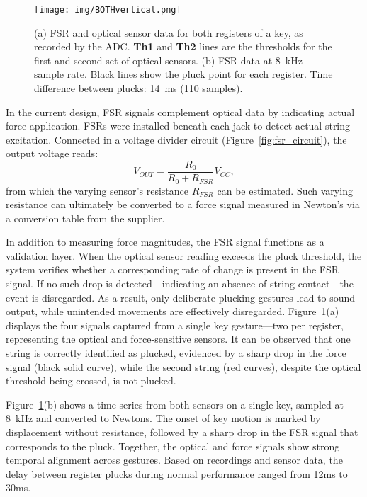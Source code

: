 \begin{figure}
    \centering
    \texttt{[image: img/BOTHvertical.png]}
    \caption{
    (a) FSR and optical sensor data for both registers of a key, as recorded by the ADC. 
    \textbf{Th1} and \textbf{Th2} lines are the thresholds for the first and second set of optical sensors.     
    (b) FSR data at 8~kHz sample rate. Black lines show the pluck point for each register. Time difference between plucks: 14~ms (110 samples).    }
    \label{fig:fsr-dif}
\end{figure}


In the current design, FSR signals complement optical data by indicating actual force application. FSRs were installed beneath each jack to detect actual string excitation. Connected in a voltage divider circuit (Figure~\ref{fig:fsr_circuit}), the output voltage reads:
\begin{equation}\label{eq:fsr_circuit}
V_{OUT} = \frac{R_0}{R_0 + R_{FSR}}V_{CC},
\end{equation}
from which the varying sensor's resistance $R_{FSR}$ can be estimated. Such varying resistance can ultimately be converted to a force signal measured in Newton's via a conversion table from the supplier. 

In addition to measuring force magnitudes, the FSR signal functions as a validation layer. When the optical sensor reading exceeds the pluck threshold, the system verifies whether a corresponding rate of change is present in the FSR signal. If no such drop is detected—indicating an absence of string contact—the event is disregarded. As a result, only deliberate plucking gestures lead to sound output, while unintended movements are effectively disregarded. Figure~\ref{fig:fsr-dif}(a) displays the four signals captured from a single key gesture—two per register, representing the optical and force-sensitive sensors. It can be observed that one string is correctly identified as plucked, evidenced by a sharp drop in the force signal (black solid curve), while the second string (red curves), despite the optical threshold being crossed, is not plucked.

Figure~\ref{fig:fsr-dif}(b) shows a time series from both sensors on a single key, sampled at 8~kHz and converted to Newtons. The onset of key motion is marked by displacement without resistance, followed by a sharp drop in the FSR signal that corresponds to the pluck. Together, the optical and force signals show strong temporal alignment across gestures. Based on recordings and sensor data, the delay between register plucks during normal performance ranged from 12ms to 30ms. 


